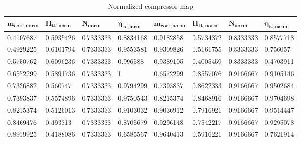 \begin{longtable}[c]{@{}llll|llll@{}}
\caption{Normalized compressor map}
\label{tab:C7_compmap}\\
\toprule
$\mathbf{\dot{m}_{corr,norm}}$ & $\mathbf{\Pi_{tt,norm}}$ & $\mathbf{N_{norm}}$ & $\mathbf{\eta_{is,norm}}$ & $\mathbf{\dot{m}_{corr,norm}}$ & $\mathbf{\Pi_{tt,norm}}$ & $\mathbf{N_{norm}}$ & $\mathbf{\eta_{is,norm}}$ \\* \midrule
\endfirsthead
%
\endhead
%
\bottomrule
\endfoot
%
\endlastfoot
%
0.4107687                   & 0.5935426                & 0.7333333            & 0.8834168                 & 0.9182858                   & 0.5734372                & 0.8333333            & 0.8577718                 \\
0.4929225                   & 0.6101794                & 0.7333333            & 0.9553581                 & 0.9309826                   & 0.5161755                & 0.8333333            & 0.756057                  \\
0.5750762                   & 0.6096236                & 0.7333333            & 0.996588                  & 0.9389105                   & 0.4005459                & 0.8333333            & 0.4703911                 \\
0.6572299                   & 0.5891736                & 0.7333333            & 1                         & 0.6572299                   & 0.8557076                & 0.9166667            & 0.9105146                 \\
0.7326882                   & 0.560747                 & 0.7333333            & 0.9794299                 & 0.7393837                   & 0.8622333                & 0.9166667            & 0.9502684                 \\
0.7393837                   & 0.5574896                & 0.7333333            & 0.9750543                 & 0.8215374                   & 0.8468916                & 0.9166667            & 0.9704698                 \\
0.8215374                   & 0.5126013                & 0.7333333            & 0.9103032                 & 0.9036912                   & 0.7916921                & 0.9166667            & 0.9514447                 \\
0.8469476                   & 0.493313                 & 0.7333333            & 0.8705679                 & 0.9296148                   & 0.7542217                & 0.9166667            & 0.9295078                 \\
0.8919925                   & 0.4188086                & 0.7333333            & 0.6585567                 & 0.9640413                   & 0.5916221                & 0.9166667            & 0.7621914                 \\

\end{longtable}
